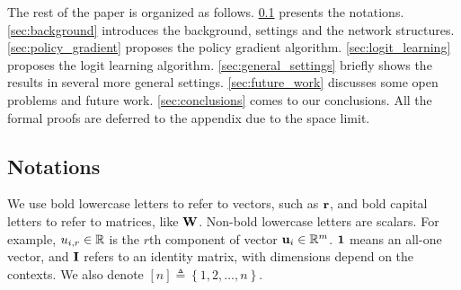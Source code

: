 



The rest of the paper is organized as follows. \cref{subsec:notations} presents the notations.   \cref{sec:background} introduces the background, settings and the network structures. \cref{sec:policy_gradient} proposes the policy gradient algorithm. \cref{sec:logit_learning} proposes the logit learning algorithm. \cref{sec:general_settings} briefly shows the results in several more general settings. \cref{sec:future_work} discusses some open problems and future work. \cref{sec:conclusions} comes to our conclusions. All the formal proofs are deferred to the appendix due to the space limit.

\subsection{Notations}
\label{subsec:notations}
We use bold lowercase letters to refer to vectors, such as ${\mathbf{r}}$, and bold capital letters to refer to matrices, like ${\mathbf{W}}$. Non-bold lowercase letters are scalars. For example, $u_{i,r} \in {\mathbb{R}}$ is the $r$th component of vector ${\mathbf{u}}_i \in {\mathbb{R}}^m$. ${\mathbf{1}}$ means an all-one vector, and ${\mathbf{I}}$ refers to an identity matrix, with dimensions depend on the contexts. We also denote $[n] \triangleq \left\{ 1,2, \dots, n \right\}$. 

